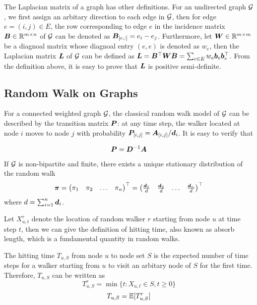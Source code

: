 \documentclass[sigconf]{acmart}
\begin{document}
The Laplacian matrix of a graph has other definitions.
For an undirected graph \(\mathcal{G}\), we first assign an arbitary direction to each edge in \(\mathcal{G}\), then for edge \(e=(i,j)\in E\), the row corresponding to edge \(e\) in the incidence matrix \(\boldsymbol{B}\in\mathbb{R}^{m\times n}\) of \(\mathcal{G}\) can be denoted as \(\boldsymbol{B}_{[e,:]}=e_i-e_j\).
Furthermore, let \(\boldsymbol{W}\in\mathbb{R}^{m\times m}\) be a diagnoal matrix whose diagnoal entry \((e,e)\) is denoted as \(w_e\), then the Laplacian matrix \(\boldsymbol{L}\) of \(\mathcal{G}\) can be defined as \(\boldsymbol{L}=\boldsymbol{B}^\top\boldsymbol{W}\boldsymbol{B}=\sum_{e\in E}w_e\boldsymbol{b}_e\boldsymbol{b}_e^\top\).
From the definition above, it is easy to prove that \(\boldsymbol{L}\) is positive semi-definite.

\subsection{Random Walk on Graphs}

For a connected weighted graph \(\mathcal{G}\), the classical random walk model of \(\mathcal{G}\) can be described by the transition matrix \(\boldsymbol{P}\): at any time step, the walker located at node \(i\) moves to node \(j\) with probability \({\boldsymbol{P}_{[i,j]}=\boldsymbol{A}_{[i,j]}}/{\boldsymbol{d}}_i\).
It is easy to verify that

\begin{equation}\label{eq:trs}
    \boldsymbol{P}=\boldsymbol{D}^{-1}\boldsymbol{A}
\end{equation}

If \(\mathcal{G}\) is non-bipartite and finite, there exists a unique stationary distribution of the random walk
\[
    \boldsymbol{\pi}=\begin{pmatrix}
        \pi_1 & \pi_2 & \dots & \pi_n
    \end{pmatrix}^\top=\begin{pmatrix}
        \frac{\boldsymbol{d}_1}{d} & \frac{\boldsymbol{d}_2}{d} & \dots & \frac{\boldsymbol{d}_n}{d}
    \end{pmatrix}^\top
\]
where \(d=\sum_{i=1}^n\boldsymbol{d}_i\).

Let \(X_{u,t}^r\) denote the location of random walker \(r\) starting from node \(u\) at time step \(t\), then we can give the definition of hitting time, also known as absorb length, which is a fundamental quantity in random walks.

\begin{definition}
    The hitting time \(T_{u,S}\) from node \(u\) to node set \(S\) is the expected number of time steps for a walker starting from \(u\) to visit an arbitary node of \(S\) for the first time. Therefore, \(T_{u,S}\) can be written as
    \[T_{u,S}^r=\min\{t:X_{u,t}\in S,t\ge0 \}\]
    \[T_{u,S}=\mathbb{E}[T_{u,S}^r]\]
\end{definition}
\end{document}
